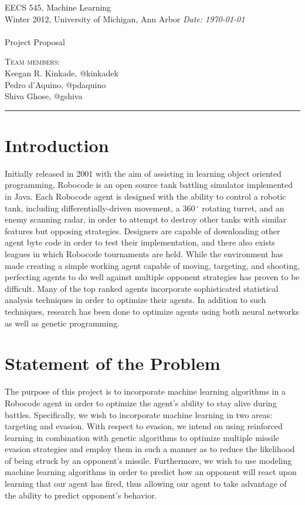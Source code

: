\documentclass{article}
\newcommand{\shortbar}{\begin{center}\rule{5ex}{0.1pt}\end{center}}
\newcommand{\courseNumber}{EECS 545}
\newcommand{\courseTitle}{Machine Learning}
\newcommand{\semester}{Winter 2012}
\theoremstyle{plain}
\theoremstyle{definition}
\theoremstyle{remark}
\newenvironment{solution}[1]{\medskip\noindent{\bf Problem #1.~}}{\shortbar}
\newcommand{\solutions}[4]{
\vspace{-2ex}
\begin{center}
{\small  \courseNumber, \courseTitle
\hfill {\Large \bf {#1} }\\
\semester, University of Michigan, Ann Arbor \hfill
{\em Date: #3}}\\
\vspace{-1ex}
\hrulefill\\
\vspace{4ex}
{\LARGE Project Proposal #2}\\
\vspace{2ex}
\end{center}
\begin{trivlist}
\item \textsc{Team members:} {#4}
\end{trivlist}
\noindent
\shortbar
\vspace{3ex}
}
\begin{document}
\solutions{}{}{\today}{\\ Keegan R. Kinkade, @kinkadek\\ Pedro d'Aquino, @pdaquino \\Shiva Ghose, @gshiva }
%
%

\section*{Introduction}

Initially released in 2001 with the aim of assisting in learning object oriented programming, Robocode is an open source tank battling simulator implemented in Java. Each Robocode agent is designed with the ability to control a robotic tank, including differentially-driven movement, a $360\,^{\circ}\mathrm{}$ rotating turret, and an enemy scanning radar, in order to attempt to destroy other tanks with similar features but opposing strategies. Designers are capable of downloading other agent byte code in order to test their implementation, and there also exists leagues in which Robocode tournaments are held. While the environment has made creating a simple working agent capable of moving, targeting, and shooting, perfecting agents to do well against multiple opponent strategies has proven to be difficult. Many of the top ranked agents incorporate sophisticated statistical analysis techniques in order to optimize their agents. In addition to such techniques, research has been done to optimize agents using both neural networks as well as genetic programming. 

\section*{Statement of the Problem}

The purpose of this project is to incorporate machine learning algorithms in a Robocode agent in order to optimize the agent's ability to stay alive during battles. Specifically, we wish to incorporate machine learning in two areas: targeting and evasion. With respect to evasion, we intend on using reinforced learning in combination with genetic algorithms to optimize multiple missile evasion strategies and employ them in such a manner as to reduce the likelihood of being struck by an opponent's missile. Furthermore, we wish to use modeling machine learning algorithms in order to predict how an opponent will react upon learning that our agent has fired, thus allowing our agent to take advantage of the ability to predict opponent's behavior. 
\end{document}

